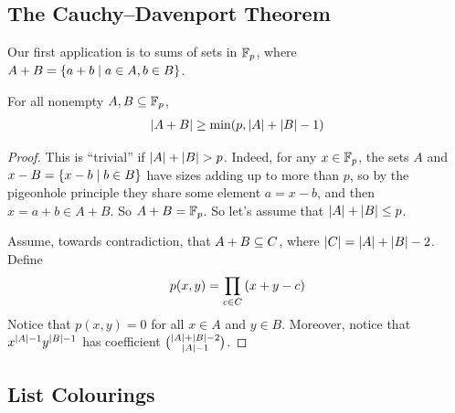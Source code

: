 \subsection{The Cauchy--Davenport Theorem}

Our first application is to sums of sets in $\mathbb{F}_p$, where $A + B = \left\{ a + b \; \middle\vert \; a \in A, b \in B \right\}$.

\begin{boxcorollary}
    For all nonempty $A, B \subseteq \mathbb{F}_p$,
    \begin{align*}
        \left\lvert A + B \right\rvert \geq \min\!\left( p, \left\lvert A \right\rvert + \left\lvert B \right\rvert - 1 \right)
    \end{align*}
\end{boxcorollary}
\begin{proof}
    This is ``trivial'' if $\left\lvert A \right\rvert + \left\lvert B \right\rvert > p$. Indeed, for any $x \in \mathbb{F}_p$, the sets $A$ and $x - B = \left\{ x - b \; \middle\vert \; b \in B \right\}$ have sizes adding up to more than $p$, so by the pigeonhole principle they share some element $a = x - b$, and then $x = a + b \in A + B$. So $A + B = \mathbb{F}_p$.
    So let's assume that $\left\lvert A \right\rvert + \left\lvert B \right\rvert \leq p$.

    Assume, towards contradiction, that $A + B \subseteq C$, where $\left\lvert C \right\rvert = \left\lvert A \right\rvert + \left\lvert B \right\rvert - 2$. Define
    \begin{align*}
        p(x, y) = \prod_{c \in C} \left( x + y - c \right)
    \end{align*}
    Notice that $p(x, y) = 0$ for all $x \in A$ and $y \in B$. Moreover, notice that $x^{\left\lvert A \right\rvert - 1} y^{\left\lvert B \right\rvert - 1}$ has coefficient $\binom{\left\lvert A \right\rvert + \left\lvert B \right\rvert - 2}{\left\lvert A \right\rvert - 1}$. \sorry
 \end{proof}

\subsection{List Colourings}

